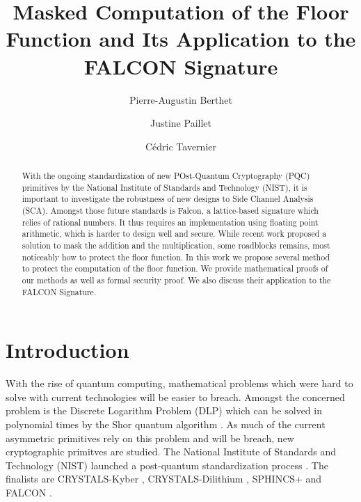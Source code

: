 \documentclass[runningheads]{llncs}
\begin{document}
%
\title{Masked Computation of the Floor Function and Its Application to the FALCON Signature}
%
%
\author{Pierre-Augustin Berthet \and
Justine Paillet \and
C\'edric Tavernier}
%
%
%
\maketitle              %
%
\begin{abstract}
With the ongoing standardization of new POst-Quantum Cryptography (PQC) primitives by the National Institute of Standards and Technology (NIST), it is important to investigate the robustness of new designs to Side Channel Analysis (SCA). Amongst those future standards is Falcon, a lattice-based signature which relies of rational numbers. It thus requires an implementation using floating point arithmetic, which is harder to design well and secure. While recent work proposed a solution to mask the addition and the multiplication, some roadblocks remains, most noticeably how to protect the floor function. In this work we propose several method to protect the computation of the floor function. We provide mathematical proofs of our methods as well as formal security proof. We also discuss their application to the FALCON Signature.

\end{abstract}
%
%
%
\section{Introduction}
With the rise of quantum computing, mathematical problems which were hard to solve with current technologies will be easier to breach. Amongst the concerned problem is the Discrete Logarithm Problem (DLP) which can be solved in polynomial times by the Shor quantum algorithm \cite{doi:10.1137/S0036144598347011}. As much of the current asymmetric primitives rely on this problem and will be breach, new cryptographic primitves are studied. The National Institute of Standards and Technology (NIST) launched a post-quantum standardization process \cite{chen2016report}. The finalists are CRYSTALS-Kyber \cite{8406610,nistfips203mlkem}, CRYSTALS-Dilithium \cite{Ducas_Kiltz_Lepoint_Lyubashevsky_Schwabe_Seiler_Stehlé_2018,nistfips204mldsa}, SPHINCS+ \cite{10.1145/3319535.3363229,nistfips205shdsa} and FALCON \cite{prest2020falcon}.
\end{document}
